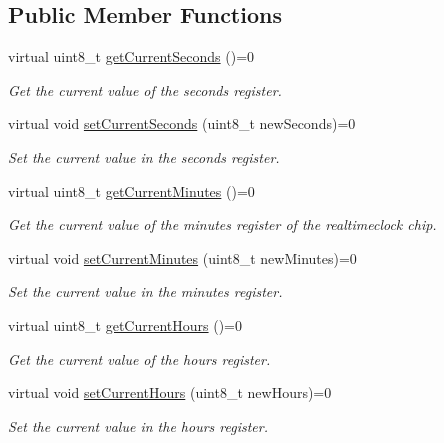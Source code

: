\subsection*{Public Member Functions}
\begin{DoxyCompactItemize}
\item 
virtual uint8\+\_\+t \mbox{\hyperlink{classreal_time_clock_a46bfe69dc650cc27e648ac7adb03afd0}{get\+Current\+Seconds}} ()=0
\begin{DoxyCompactList}\small\item\em Get the current value of the seconds register. \end{DoxyCompactList}\item 
virtual void \mbox{\hyperlink{classreal_time_clock_a463a64d4861c75e26a80712e1dd50e6b}{set\+Current\+Seconds}} (uint8\+\_\+t new\+Seconds)=0
\begin{DoxyCompactList}\small\item\em Set the current value in the seconds register. \end{DoxyCompactList}\item 
virtual uint8\+\_\+t \mbox{\hyperlink{classreal_time_clock_a8436f171be03d35a931004b3f3b144e9}{get\+Current\+Minutes}} ()=0
\begin{DoxyCompactList}\small\item\em Get the current value of the minutes register of the realtimeclock chip. \end{DoxyCompactList}\item 
virtual void \mbox{\hyperlink{classreal_time_clock_a52da7366cd5f1e4c270eb87e7298da42}{set\+Current\+Minutes}} (uint8\+\_\+t new\+Minutes)=0
\begin{DoxyCompactList}\small\item\em Set the current value in the minutes register. \end{DoxyCompactList}\item 
virtual uint8\+\_\+t \mbox{\hyperlink{classreal_time_clock_a2861a9bc75466a762b4cd8ce37193247}{get\+Current\+Hours}} ()=0
\begin{DoxyCompactList}\small\item\em Get the current value of the hours register. \end{DoxyCompactList}\item 
virtual void \mbox{\hyperlink{classreal_time_clock_a515d9de6067ae563bff5217da5100a23}{set\+Current\+Hours}} (uint8\+\_\+t new\+Hours)=0
\begin{DoxyCompactList}\small\item\em Set the current value in the hours register. \end{DoxyCompactList}\item 

\end{DoxyCompactItemize}
